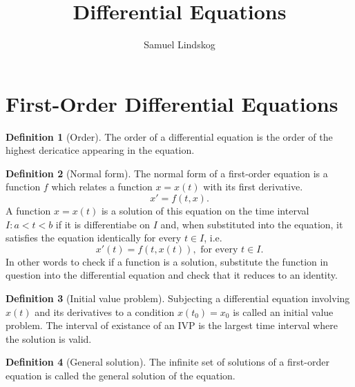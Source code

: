 \documentclass[nobib,notoc]{tufte-handout}
\begin{document}
\theoremstyle{definition}\newtheorem{defi}{Definition}[section]
\theoremstyle{definition}\newtheorem{axiom}{Axiom}[section]
\theoremstyle{definition}\newtheorem{thm}{Theorem}[section]
\theoremstyle{definition}\newtheorem{cor}{Corollary}[section]
\theoremstyle{definition}\newtheorem{lem}{Lemma}[section]
\theoremstyle{remark}\newtheorem*{notat}{Notation}
\theoremstyle{remark}\newtheorem*{rema}{Remark}
\theoremstyle{definition}\newtheorem{problem}{Problem}
\newenvironment{prob}[1]{\protect\setcounter{problem}{#1}\addtocounter{problem}{-1}\begin{problem}}{\end{problem}}

\title{Differential Equations}
\author{Samuel Lindskog}
\maketitle

\setcounter{section}{1}

\section{First-Order Differential Equations}
\begin{defi}[Order]
	The order of a differential equation is the order of the highest dericatice appearing in the equation.
\end{defi}
\begin{defi}[Normal form]
	The normal form of a first-order equation is a function \(f\) which relates a function \(x=x(t)\) with its first derivative.
	\begin{equation*}
		x'=f(t,x).
	\end{equation*}
	A function \(x=x(t)\) is a solution of this equation on the time interval \(I:a<t<b\) if it is differentiabe on \(I\) and, when substituted into the equation, it satisfies the equation identically for every \(t\in I\), i.e.
	\begin{equation*}
		x'(t)=f(t,x(t)),\text{ for every }t\in I.
	\end{equation*}
	In other words to check if a function is a solution, substitute the function in question into the differential equation and check that it reduces to an identity.
\end{defi}
\begin{defi}[Initial value problem]
	Subjecting a differential equation involving \(x(t)\) and its derivatives to a condition \(x(t_0)=x_0\) is called an initial value problem. The interval of existance of an IVP is the largest time interval where the solution is valid.
\end{defi}
\begin{defi}[General solution]
	The infinite set of solutions of a first-order equation is called the general solution of the equation.
\end{defi}
\end{document}
